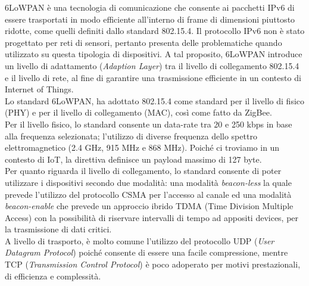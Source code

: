 \noindent 6LoWPAN è una tecnologia di comunicazione che consente ai pacchetti IPv6 di essere trasportati in modo efficiente all'interno di frame di dimensioni piuttosto ridotte, come quelli definiti dallo standard 802.15.4.
Il protocollo IPv6 non è stato progettato per reti di sensori, pertanto presenta delle problematiche quando utilizzato su questa tipologia di dispositivi. A tal proposito, 6LoWPAN introduce un livello di adattamento (\textit{Adaption Layer}) tra il livello di collegamento 802.15.4 e il livello di rete, al fine di garantire una trasmissione efficiente in un contesto di Internet of Things.\\
Lo standard 6LoWPAN, ha adottato 802.15.4 come standard per il livello di fisico (PHY) e per il livello di collegamento (MAC), così come fatto da ZigBee.\\
Per il livello fisico, lo standard consente un data-rate tra 20 e 250 kbps in base alla frequenza selezionata; l'utilizzo di diverse frequenza dello spettro elettromagnetico (2.4 GHz, 915 MHz e 868 MHz). Poiché ci troviamo in un contesto di IoT, la direttiva definisce un payload massimo di 127 byte.\\
Per quanto riguarda il livello di collegamento, lo standard consente di poter utilizzare i dispositivi secondo due modalità: una modalità \textit{beacon-less} la quale prevede l'utilizzo del protocollo CSMA per l'accesso al canale ed una modalità \textit{beacon-enable} che prevede un approccio ibrido TDMA (Time Division Multiple Access) con la possibilità di riservare intervalli di tempo ad appositi devices, per la trasmissione di dati critici.\\
A livello di trasporto, è molto comune l'utilizzo del protocollo UDP (\textit{User Datagram Protocol}) poiché consente di essere una facile compressione, mentre TCP (\textit{Transmission Control Protocol}) è poco adoperato per motivi prestazionali, di efficienza e complessità.


